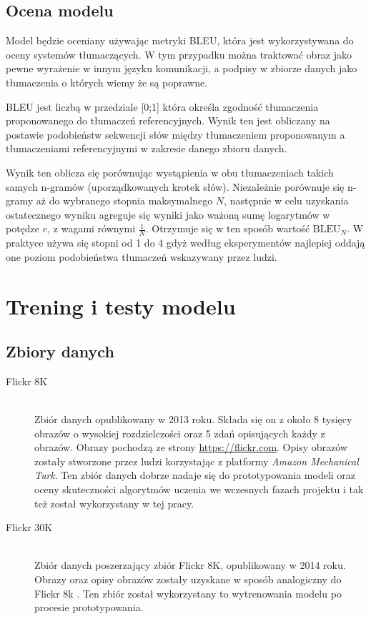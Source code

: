 \subsection{Ocena modelu}
Model będzie oceniany używając metryki BLEU\cite{BLEU}, która jest wykorzystywana do oceny systemów tłumaczących. W tym przypadku można traktować
obraz jako pewne wyrażenie w innym języku komunikacji, a podpisy w zbiorze danych jako tłumaczenia o których wiemy że są poprawne.

BLEU jest liczbą w przedziale [0;1] która określa zgodność tłumaczenia proponowanego do tłumaczeń referencyjnych.
Wynik ten jest obliczany na postawie podobieństw sekwencji słów między tłumaczeniem proponowanym a tłumaczeniami referencyjnymi w zakresie danego zbioru danych.

Wynik ten oblicza się porównując wystąpienia w obu tłumaczeniach takich samych n-gramów (uporządkowanych krotek słów). Niezależnie porównuje się n-gramy aż do wybranego stopnia maksymalnego $N$, następnie w celu uzyskania ostatecznego wyniku agreguje się wyniki jako ważoną sumę logarytmów w potędze $e$, z wagami równymi $\frac{1}{N}$. Otrzymuje się w ten sposób wartość $\textrm{BLEU}_N$. W praktyce używa się stopni od 1 do 4 gdyż według eksperymentów najlepiej oddają one poziom podobieństwa tłumaczeń wskazywany przez ludzi.\cite[p.~4]{BLEU}

\newpage

\section{Trening i testy modelu}
\subsection{Zbiory danych}
\begin{description}
	\item[Flickr 8K] \hfill \\ Zbiór danych opublikowany w 2013 roku.
	Składa się on z około 8 tysięcy obrazów o wysokiej rozdzielczości oraz 5 zdań opisujących każdy z obrazów.
	Obrazy pochodzą ze strony \url{https://flickr.com}.
	Opisy obrazów zostały stworzone przez ludzi korzystając z platformy \textit{Amazon Mechanical Turk}\cite{Flickr8k}.
	Ten zbiór danych dobrze nadaje się do prototypowania modeli oraz oceny skuteczności algorytmów uczenia we wczesnych fazach projektu i tak też został wykorzystany w tej pracy.
	\item[Flickr 30K] \hfill \\ Zbiór danych poszerzający zbiór Flickr 8K, opublikowany w 2014 roku.
	Obrazy oraz opisy obrazów zostały uzyskane w sposób analogiczny do Flickr 8k \cite{Flickr30k}. Ten zbiór został wykorzystany to wytrenowania modelu po procesie prototypowania.
\end{description}


